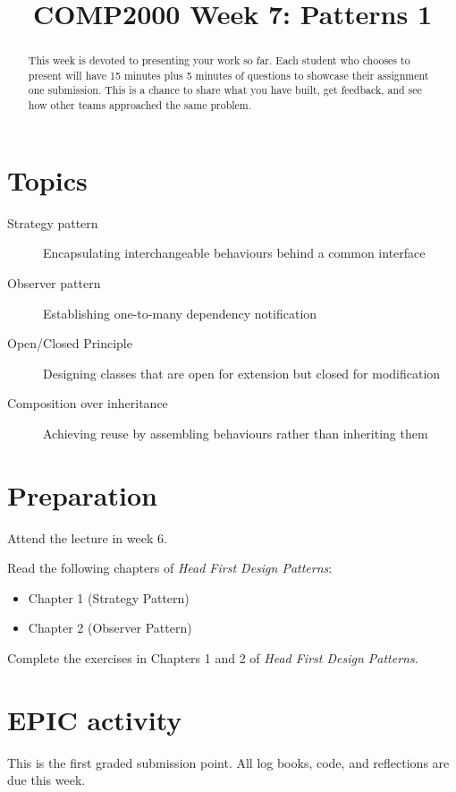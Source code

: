 \documentclass[twoside=false,DIV=14]{scrartcl}
\title{\color{redish} \vspace{-1em}COMP2000 Week 7: Patterns 1}
\begin{document}
{\color{blackish}\maketitle}\vspace{-7em}

\begin{abstract}
This week is devoted to presenting your work so far.  Each student who chooses to present will have 15 minutes plus 5 minutes of questions to showcase their assignment one submission.  This is a chance to share what you have built, get feedback, and see how other teams approached the same problem.
\end{abstract}

\section*{Topics}
\begin{description}
\item[Strategy pattern] Encapsulating interchangeable behaviours behind a common interface
\item[Observer pattern] Establishing one-to-many dependency notification
\item[Open/Closed Principle] Designing classes that are open for extension but closed for modification
\item[Composition over inheritance] Achieving reuse by assembling behaviours rather than inheriting them
\end{description}

\section*{Preparation}
Attend the lecture in week 6.

Read the following chapters of \textit{Head First Design Patterns}:
\begin{itemize}
    \item Chapter 1 (Strategy Pattern)
    \item Chapter 2 (Observer Pattern)
\end{itemize}
Complete the exercises in Chapters 1 and 2 of \textit{Head First Design Patterns}.


\section*{EPIC activity}

\begin{note}
This is the first graded submission point.  All log books, code, and reflections are due this week.
\end{note}
\end{document}
